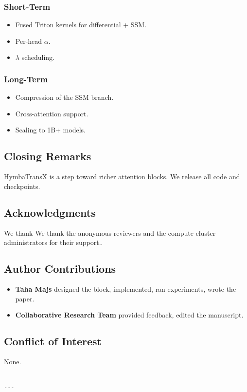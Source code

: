 \subsubsection{Short-Term}
\begin{itemize}
\item Fused Triton kernels for differential + SSM.
\item Per-head $\alpha$.
\item $\lambda$ scheduling.

\end{itemize}
\subsubsection{Long-Term}
\begin{itemize}
\item Compression of the SSM branch.
\item Cross-attention support.
\item Scaling to 1B+ models.

\end{itemize}
\subsection{Closing Remarks}

HymbaTransX is a step toward richer attention blocks. We release all code 
and checkpoints.

\subsection{Acknowledgments}

We thank We thank the anonymous reviewers and the compute cluster administrators for their support..

\subsection{Author Contributions}

\begin{itemize}
\item \textbf{Taha Majs} designed the block, implemented, ran experiments, wrote
  the paper.
\item \textbf{Collaborative Research Team} provided feedback, edited the manuscript.

\end{itemize}
\subsection{Conflict of Interest}

None.
\begin{lstlisting}

---
\end{lstlisting}